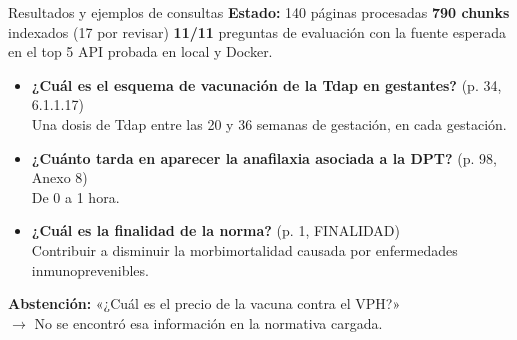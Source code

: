 \documentclass[aspectratio=169,11pt]{beamer}
\begin{document}
\begin{frame}{Resultados y ejemplos de consultas}
  \small
  \textbf{Estado:} 140 páginas procesadas \textperiodcentered{} \textbf{790 chunks} indexados
  (17 por revisar) \textperiodcentered{} \textbf{11/11} preguntas de evaluación con la fuente
  esperada en el top 5 \textperiodcentered{} API probada en local y Docker.

  \vspace{2mm}
  \begin{itemize}
    \item \textbf{¿Cuál es el esquema de vacunación de la Tdap en gestantes?}\hfill
          {\scriptsize\color{azul}(p. 34, 6.1.1.17)}\\
          Una dosis de Tdap entre las 20 y 36 semanas de gestación, en cada gestación.
    \item \textbf{¿Cuánto tarda en aparecer la anafilaxia asociada a la DPT?}\hfill
          {\scriptsize\color{azul}(p. 98, Anexo 8)}\\
          De 0 a 1 hora.
    \item \textbf{¿Cuál es la finalidad de la norma?}\hfill
          {\scriptsize\color{azul}(p. 1, FINALIDAD)}\\
          Contribuir a disminuir la morbimortalidad causada por enfermedades inmunoprevenibles.
  \end{itemize}

  \vspace{1mm}
  {\footnotesize\textbf{Abstención:} «¿Cuál es el precio de la vacuna contra el VPH?»\\
   $\rightarrow$ No se encontró esa información en la normativa cargada.}
\end{frame}
\end{document}
